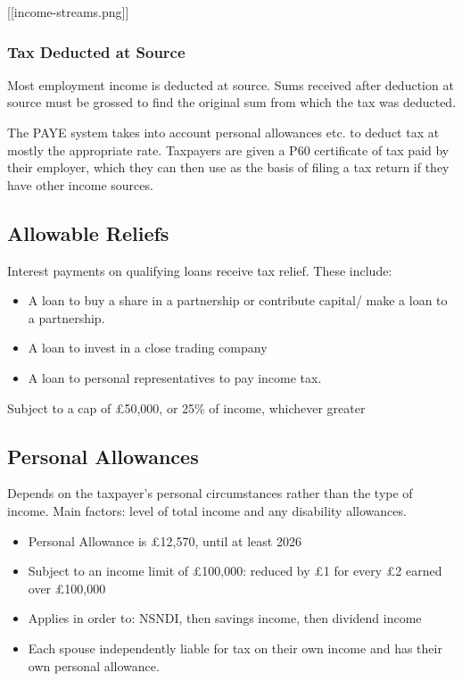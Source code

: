 \documentclass[
]{article}
\providecommand{\tightlist}{%
  \setlength{\itemsep}{0pt}\setlength{\parskip}{0pt}}
\begin{document}
{[}{[}income-streams.png{]}{]}

\hypertarget{tax-deducted-at-source}{%
\subsubsection{Tax Deducted at Source}\label{tax-deducted-at-source}}

Most employment income is deducted at source. Sums received after
deduction at source must be grossed to find the original sum from which
the tax was deducted.

The PAYE system takes into account personal allowances etc. to deduct
tax at mostly the appropriate rate. Taxpayers are given a P60
certificate of tax paid by their employer, which they can then use as
the basis of filing a tax return if they have other income sources.

\hypertarget{allowable-reliefs}{%
\subsection{Allowable Reliefs}\label{allowable-reliefs}}

Interest payments on qualifying loans receive tax relief. These include:

\begin{itemize}
\tightlist
\item
  A loan to buy a share in a partnership or contribute capital/ make a
  loan to a partnership.
\item
  A loan to invest in a close trading company
\item
  A loan to personal representatives to pay income tax.
\end{itemize}

Subject to a cap of £50,000, or 25\% of income, whichever greater

\hypertarget{personal-allowances}{%
\subsection{Personal Allowances}\label{personal-allowances}}

Depends on the taxpayer's personal circumstances rather than the type of
income. Main factors: level of total income and any disability
allowances.

\begin{itemize}
\tightlist
\item
  Personal Allowance is £12,570, until at least 2026
\item
  Subject to an income limit of £100,000: reduced by £1 for every £2
  earned over £100,000
\item
  Applies in order to: NSNDI, then savings income, then dividend income
\item
  Each spouse independently liable for tax on their own income and has
  their own personal allowance.
\end{itemize}
\end{document}
